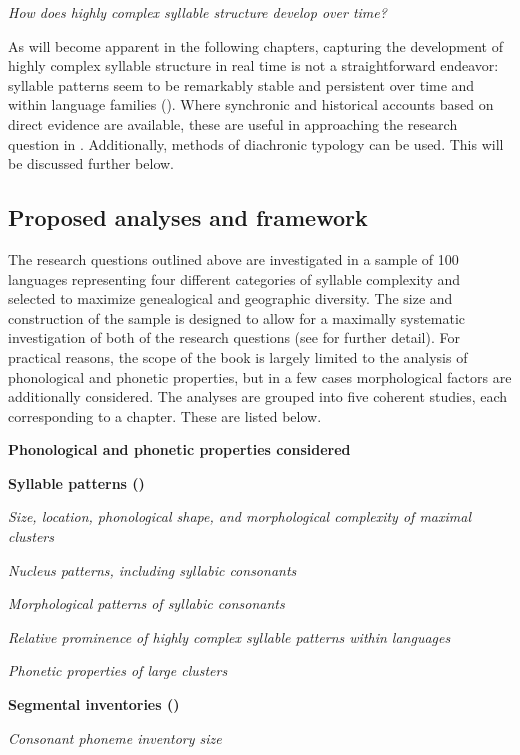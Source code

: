 \ea\label{ex:1.24}
   \textit{How does highly complex syllable structure develop over time?}
\z

  As will become apparent in the following chapters, capturing the development of highly complex syllable structure in real time is not a straightforward endeavor: syllable patterns seem to be remarkably stable and persistent over time and within language families (\citealt{NapoleãodeSouza2017}). Where synchronic and historical accounts based on direct evidence are available, these are useful in approaching the research question in . Additionally, methods of diachronic typology can be used. This will be discussed further below.

\subsection{Proposed analyses and framework}\label{sec:1.4.2}

  The research questions outlined above are investigated in a sample of 100 languages representing four different categories of syllable complexity and selected to maximize genealogical and geographic diversity. The size and construction of the sample is designed to allow for a maximally systematic investigation of both of the research questions (see  for further detail). For practical reasons, the scope of the book is largely limited to the analysis of phonological and phonetic properties, but in a few cases morphological factors are additionally considered. The analyses are grouped into five coherent studies, each corresponding to a chapter. These are listed below.

\ea\label{ex:1.25}
  \textbf{Phonological and phonetic properties considered}

\textbf{Syllable patterns ()}

\textit{Size, location, phonological shape, and morphological complexity of maximal clusters}

\textit{Nucleus patterns, including syllabic consonants}

\textit{Morphological patterns of syllabic consonants}

\textit{Relative prominence of highly complex syllable patterns within languages}

\textit{Phonetic properties of large clusters}

\textbf{Segmental inventories ()}

\textit{Consonant phoneme inventory size}


